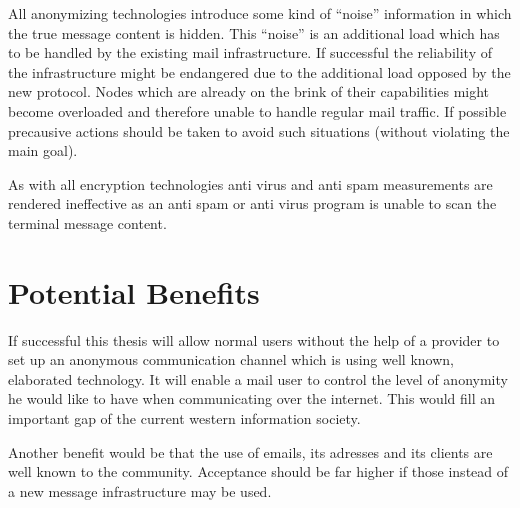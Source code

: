 \documentclass[twocolumn,a4paper,10pt,english]{scrartcl}
\begin{document}
All anonymizing technologies introduce some kind of ``noise'' information in which the true message content is hidden. This ``noise'' is an additional load which has to be handled by the existing mail infrastructure. If successful the reliability of the infrastructure might be endangered due to the additional load opposed by the new protocol. Nodes which are already on the brink of their capabilities might become overloaded and therefore unable to handle regular mail traffic. If possible precausive actions should be taken to avoid such situations (without violating the main goal).\par

As with all encryption technologies anti virus and anti spam measurements are rendered ineffective as an anti spam or anti virus program is unable to scan the terminal message content.\par

\section{Potential Benefits}
If successful this thesis will allow normal users without the help of a provider to set up an anonymous communication channel which is using well known, elaborated technology. It will enable a mail user to control the level of anonymity he would like to have when communicating over the internet. This would fill an important gap of the current western information society. \par

Another benefit would be that the use of emails, its adresses and its clients are well known to the community. Acceptance should be far higher if those instead of a new message infrastructure may be used.\par
\end{document}
